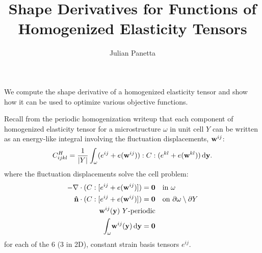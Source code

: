 \documentclass[10pt]{article}
\title{Shape Derivatives for Functions of Homogenized Elasticity Tensors}
\author{Julian Panetta}
\begin{document}
\maketitle

We compute the shape derivative of a homogenized elasticity tensor and show how
it can be used to optimize various objective functions.

Recall from the periodic homogenization writeup that each component of
homogenized elasticity tensor for a microstructure $\omega$ in unit cell $Y$
can be written as an energy-like integral involving the fluctuation
displacements, ${\bf w}^{ij}$:
\begin{equation}
    \label{eqn:EhEnergy}
    C^H_{ijkl} = \frac{1}{|Y|} \int_\omega (e^{ij} + e({\bf w}^{ij})) : C : (e^{kl} + e({\bf w}^{kl})) \, \mathrm{d} {\bf y}.
\end{equation}
where the fluctuation displacements solve the cell problem:
\begin{equation}
\label{eqn:cell_constraint}
\begin{aligned}
     -\nabla \cdot (C : [e^{ij} + e({\bf w}^{ij})]) = {\bf 0} & \quad \text{in } \omega \\
{\bf \hat n} \cdot (C : [e^{ij} + e({\bf w}^{ij})]) = {\bf 0} & \quad \text{on } \partial \omega \setminus \partial Y \\
    {\bf w}^{ij}({\bf y})\ Y \text{-periodic} & \\
    \int_\omega \! {\bf w}^{ij}({\bf y})  \, \mathrm{d} {\bf y} =  {\bf 0}
\end{aligned}
\end{equation}
for each of the 6 (3 in 2D), constant strain basis tensors $e^{ij}$.

\end{document}
